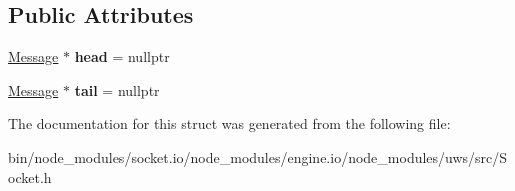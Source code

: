 \subsection*{Public Attributes}
\begin{DoxyCompactItemize}
\item 
\mbox{\label{structu_s_1_1_socket_1_1_queue_ac5e721ed2fa4d643bfed54c6bfa66ab6}} 
\mbox{\hyperlink{structu_s_1_1_socket_1_1_queue_1_1_message}{Message}} $\ast$ {\bfseries head} = nullptr
\item 
\mbox{\label{structu_s_1_1_socket_1_1_queue_a6b4a95a1ffc433f72e10f4069b225d46}} 
\mbox{\hyperlink{structu_s_1_1_socket_1_1_queue_1_1_message}{Message}} $\ast$ {\bfseries tail} = nullptr
\end{DoxyCompactItemize}


The documentation for this struct was generated from the following file\+:\begin{DoxyCompactItemize}
\item 
bin/node\+\_\+modules/socket.\+io/node\+\_\+modules/engine.\+io/node\+\_\+modules/uws/src/Socket.\+h\end{DoxyCompactItemize}

